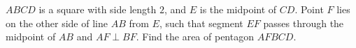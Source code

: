 $ABCD$ is a square with side length $2$, and $E$ is the midpoint of $CD$. Point $F$ lies on the other side of line $AB$ from $E$, such that segment $EF$ passes through the midpoint of $AB$ and $AF\perp BF$. Find the area of pentagon $AFBCD$.
